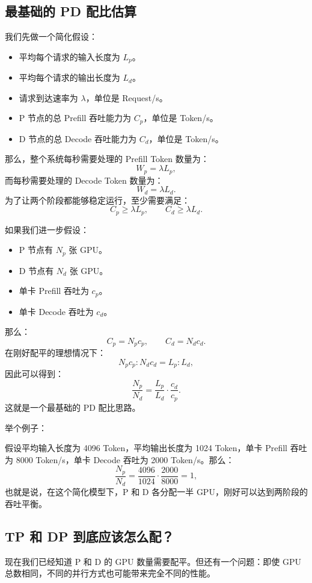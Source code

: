 \documentclass[11pt]{article}
\begin{document}
\subsection{最基础的 PD 配比估算}

我们先做一个简化假设：

\begin{itemize}
  \item 平均每个请求的输入长度为 $L_p$。
  \item 平均每个请求的输出长度为 $L_d$。
  \item 请求到达速率为 $\lambda$，单位是 Request/s。
  \item P 节点的总 Prefill 吞吐能力为 $C_p$，单位是 Token/s。
  \item D 节点的总 Decode 吞吐能力为 $C_d$，单位是 Token/s。
\end{itemize}

那么，整个系统每秒需要处理的 Prefill Token 数量为：
\[
  W_p = \lambda L_p,
\]
而每秒需要处理的 Decode Token 数量为：
\[
  W_d = \lambda L_d.
\]
为了让两个阶段都能够稳定运行，至少需要满足：
\[
  C_p \ge \lambda L_p,\qquad C_d \ge \lambda L_d.
\]

如果我们进一步假设：

\begin{itemize}
  \item P 节点有 $N_p$ 张 GPU。
  \item D 节点有 $N_d$ 张 GPU。
  \item 单卡 Prefill 吞吐为 $c_p$。
  \item 单卡 Decode 吞吐为 $c_d$。
\end{itemize}

那么：
\[
  C_p = N_p c_p,\qquad C_d = N_d c_d.
\]
在刚好配平的理想情况下：
\[
  N_p c_p : N_d c_d = L_p : L_d,
\]
因此可以得到：
\[
  \frac{N_p}{N_d} = \frac{L_p}{L_d}\cdot\frac{c_d}{c_p}.
\]
这就是一个最基础的 PD 配比思路。

举个例子：

假设平均输入长度为 4096 Token，平均输出长度为 1024 Token，单卡 Prefill 吞吐为 8000 Token/s，单卡 Decode 吞吐为 2000 Token/s。那么：
\[
  \frac{N_p}{N_d} = \frac{4096}{1024}\cdot\frac{2000}{8000} = 1,
\]
也就是说，在这个简化模型下，P 和 D 各分配一半 GPU，刚好可以达到两阶段的吞吐平衡。

\subsection{TP 和 DP 到底应该怎么配？}

现在我们已经知道 P 和 D 的 GPU 数量需要配平。但还有一个问题：即使 GPU 总数相同，不同的并行方式也可能带来完全不同的性能。
\end{document}
